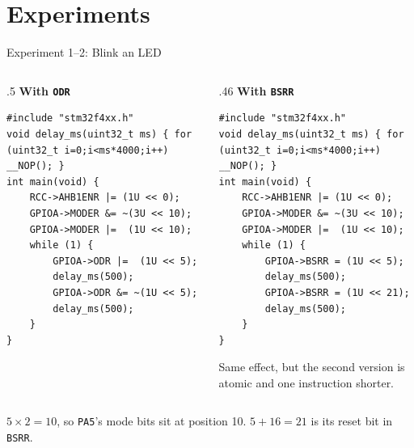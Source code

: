 \documentclass[9pt,aspectratio=169,xcolor=table]{beamer}
\begin{document}
\section{Experiments}

\begin{frame}[fragile]{Experiment 1--2: Blink an LED}
    \begin{columns}[T]
    \begin{column}{.5\textwidth}
        \textbf{With \texttt{ODR}}
\begin{lstlisting}[style=myc, basicstyle=\ttfamily\scriptsize]
#include "stm32f4xx.h"
void delay_ms(uint32_t ms) { for (uint32_t i=0;i<ms*4000;i++) __NOP(); }
int main(void) {
    RCC->AHB1ENR |= (1U << 0);
    GPIOA->MODER &= ~(3U << 10);
    GPIOA->MODER |=  (1U << 10);
    while (1) {
        GPIOA->ODR |=  (1U << 5);
        delay_ms(500);
        GPIOA->ODR &= ~(1U << 5);
        delay_ms(500);
    }
}
\end{lstlisting}
    \end{column}
    \begin{column}{.46\textwidth}
        \textbf{With \texttt{BSRR}}
\begin{lstlisting}[style=myc, basicstyle=\ttfamily\scriptsize]
#include "stm32f4xx.h"
void delay_ms(uint32_t ms) { for (uint32_t i=0;i<ms*4000;i++) __NOP(); }
int main(void) {
    RCC->AHB1ENR |= (1U << 0);
    GPIOA->MODER &= ~(3U << 10);
    GPIOA->MODER |=  (1U << 10);
    while (1) {
        GPIOA->BSRR = (1U << 5);
        delay_ms(500);
        GPIOA->BSRR = (1U << 21);
        delay_ms(500);
    }
}
\end{lstlisting}

        \vspace{2mm}
        {\small Same effect, but the second version is \alert{atomic} and
        one instruction shorter.}
    \end{column}
    \end{columns}

    \vspace{2mm}
    {\small $5 \times 2 = 10$, so \texttt{PA5}'s mode bits sit at position
    10. $5 + 16 = 21$ is its reset bit in \texttt{BSRR}.}
\end{frame}
\end{document}
